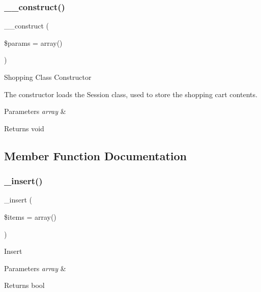 \subsubsection{\texorpdfstring{\+\_\+\+\_\+construct()}{\_\_construct()}}
{\footnotesize\ttfamily \+\_\+\+\_\+construct (\begin{DoxyParamCaption}\item[{}]{\$params = {\ttfamily array()} }\end{DoxyParamCaption})}

Shopping Class Constructor

The constructor loads the Session class, used to store the shopping cart contents.


\begin{DoxyParams}{Parameters}
{\em array} & \\
\hline
\end{DoxyParams}
\begin{DoxyReturn}{Returns}
void 
\end{DoxyReturn}


\subsection{Member Function Documentation}
\mbox{\label{class_c_i___cart_a55d27979573b7d46bdf774f247c15b07}} 
\subsubsection{\texorpdfstring{\+\_\+insert()}{\_insert()}}
{\footnotesize\ttfamily \+\_\+insert (\begin{DoxyParamCaption}\item[{}]{\$items = {\ttfamily array()} }\end{DoxyParamCaption})\hspace{0.3cm}{\ttfamily [protected]}}

Insert


\begin{DoxyParams}{Parameters}
{\em array} & \\
\hline
\end{DoxyParams}
\begin{DoxyReturn}{Returns}
bool 
\end{DoxyReturn}
\mbox{\label{class_c_i___cart_abaa559f3e9e7f8ad933f19165fb61083}} 
